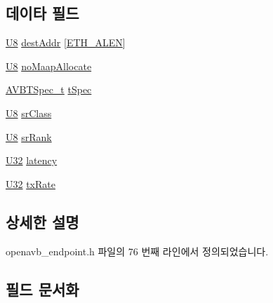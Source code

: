 \subsection*{데이타 필드}
\begin{DoxyCompactItemize}
\item 
\hyperlink{openavb__types__base__pub_8h_aa63ef7b996d5487ce35a5a66601f3e73}{U8} \hyperlink{structopenavb_endpoint_params___talker_register__t_a016f2167ae2143dcacd762c10be2f614}{dest\+Addr} \mbox{[}\hyperlink{avb__avtp_8h_a9822d89774e0d6ddaa06503950130423}{E\+T\+H\+\_\+\+A\+L\+EN}\mbox{]}
\item 
\hyperlink{openavb__types__base__pub_8h_aa63ef7b996d5487ce35a5a66601f3e73}{U8} \hyperlink{structopenavb_endpoint_params___talker_register__t_abf4e8a02abcc2e65fbd3bf5a24840efd}{no\+Maap\+Allocate}
\item 
\hyperlink{struct_a_v_b_t_spec__t}{A\+V\+B\+T\+Spec\+\_\+t} \hyperlink{structopenavb_endpoint_params___talker_register__t_ab928eca0e7b010a8cc3a80be5bc8adcc}{t\+Spec}
\item 
\hyperlink{openavb__types__base__pub_8h_aa63ef7b996d5487ce35a5a66601f3e73}{U8} \hyperlink{structopenavb_endpoint_params___talker_register__t_a0ce524f0210a76139ed0aa1ae3ff24f4}{sr\+Class}
\item 
\hyperlink{openavb__types__base__pub_8h_aa63ef7b996d5487ce35a5a66601f3e73}{U8} \hyperlink{structopenavb_endpoint_params___talker_register__t_a9faa29fc50359ae52f04cfa689490b06}{sr\+Rank}
\item 
\hyperlink{openavb__types__base__pub_8h_a696390429f2f3b644bde8d0322a24124}{U32} \hyperlink{structopenavb_endpoint_params___talker_register__t_ae16309c230017ae952e8a54441556efc}{latency}
\item 
\hyperlink{openavb__types__base__pub_8h_a696390429f2f3b644bde8d0322a24124}{U32} \hyperlink{structopenavb_endpoint_params___talker_register__t_a348c4c50e96126b5b29920234ecae1e5}{tx\+Rate}
\end{DoxyCompactItemize}


\subsection{상세한 설명}


openavb\+\_\+endpoint.\+h 파일의 76 번째 라인에서 정의되었습니다.



\subsection{필드 문서화}
